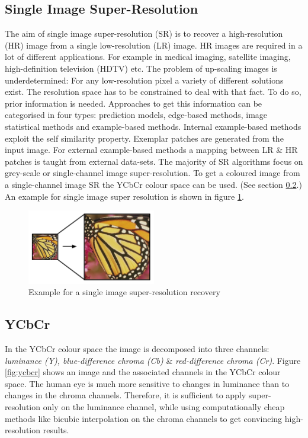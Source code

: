 \documentclass[
			fontsize = 12pt,
			paper = a4
			]
			{scrartcl}%
\newcommand{\?}{\ensuremath{^\texttt{\textbf [CITATION~NEEDED]}}}
\begin{document}
\subsection{Single Image Super-Resolution}
\label{sec:SR}
The aim of single image super-resolution (SR) is to recover a high-resolution (HR) image from a single low-resolution (LR) image. HR images are required in a lot of different applications. For example in medical imaging, satellite imaging, high-deﬁnition television (HDTV) etc. The problem of up-scaling images is underdetermined: For any low-resolution pixel a variety of different solutions exist. The resolution space has to be constrained to deal with that fact. To do so, prior information is needed. Approaches to get this information can be categorised in four types: prediction models, edge-based methods, image statistical methods and example-based methods. Internal example-based methods exploit the self similarity property. Exemplar patches are generated from the input image. For external example-based methods a mapping between LR \& HR patches is taught from external data-sets. The majority of SR algorithms focus on grey-scale or single-channel image super-resolution. To get a coloured image from a single-channel image SR the YCbCr colour space can be used. (See section \ref{sec:YCbCr}.) An example for single image super resolution is shown in figure \ref{fig:superres}. \cite{abd2012image}

\begin{figure}[H]
    \centering
    \includegraphics[width=0.5\textwidth]{fig/superresolution.PNG}
    \caption{Example for a single image super-resolution recovery}
    \label{fig:superres}
\end{figure}

\subsection{YCbCr}
\label{sec:YCbCr}
In the YCbCr colour space the image is decomposed into three channels: \textit{luminance (Y), blue-difference chroma (Cb)} \& \textit{red-difference chroma (Cr)}. Figure \ref{fig:ycbcr} shows an image and the associated channels in the YCbCr colour space. The human eye is much more sensitive to changes in luminance than to changes in the chroma channels. Therefore, it is sufficient to apply super-resolution only on the luminance channel, while using computationally cheap methods like bicubic interpolation on the chroma channels to get convincing high-resolution results.
\end{document}
